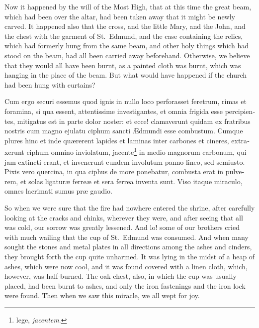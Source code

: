 \documentclass{book}
\begin{document}
\begin{paracol}{2}
\switchcolumn

Now it happened by the will of the Most High, that at this time the great beam, which had been over the altar, had been taken away that it might be newly carved. It happened also that the cross, and the little Mary, and the John, and the chest with the garment of St.\ Edmund, and the case containing the relics, which had formerly hung from the same beam, and other holy things which had stood on the beam, had all been carried away beforehand. Otherwise, we believe that they would all have been burnt, as a painted cloth was burnt, which was hanging in the place of the beam. But what would have happened if the church had been hung with curtains?

\switchcolumn*

\begin{otherlanguage}{latin}
Cum ergo securi essemus quod ignis in nullo loco perforasset feretrum, rimas et foramina, si qua essent, attentissime investigantes, et omnia frigida esse percipientes, mitigatus est in parte dolor noster: et ecce! clamaverunt quidam ex fratribus nostris cum magno ejulatu ciphum sancti \AE{}dmundi esse combustum. Cumque plures hinc et inde qu\ae{}rerent lapides et laminas inter carbones et cineres, extraxerunt ciphum omnino inviolatum, jacente\footnote[\textdagger]{lege, \emph{jacentem}.} in medio magnorum carbonum, qui jam extincti erant, et invenerunt eundem involutum panno lineo, sed semiusto. Pixis vero quercina, in qua ciphus de more ponebatur, combusta erat in pulverem, et solas ligatur\ae{} ferre\ae{} et sera ferrea inventa sunt. Viso itaque miraculo, omnes lacrimati sumus pr\ae{} gaudio. 
\end{otherlanguage}

\switchcolumn

So when we were sure that the fire had nowhere entered the shrine, after carefully looking at the cracks and chinks, wherever they were, and after seeing that all was cold, our sorrow was greatly lessened. And lo! some of our brothers cried with much wailing that the cup of St.\ Edmund was consumed. And when many sought the stones and metal plates in all directions among the ashes and cinders, they brought forth the cup quite unharmed. It was lying in the midst of a heap of ashes, which were now cool, and it was found covered with a linen cloth, which, however, was half-burned. The oak chest, also, in which the cup was usually placed, had been burnt to ashes, and only the iron fastenings and the iron lock were found. Then when we saw this miracle, we all wept for joy.


\end{paracol}
\end{document}
